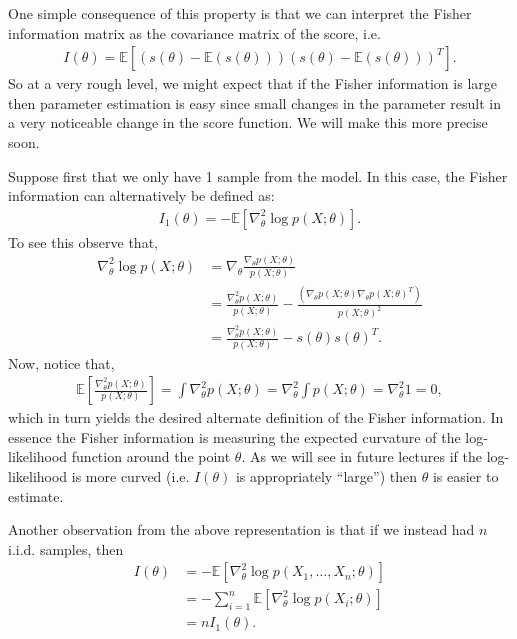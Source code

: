 \documentclass[twoside,12pt]{article}
\begin{document}
One simple consequence of this property is that we can interpret the Fisher information matrix as the covariance matrix of the score, i.e.
\begin{align*}
I(\theta) = \mathbb{E} [ (s(\theta) - \mathbb{E}(s(\theta)))(s(\theta)  - \mathbb{E}(s(\theta)))^T].
\end{align*}
So at a very rough level, we might expect that if the Fisher information is large then parameter estimation is easy since small changes in the parameter result in a very noticeable change in the score function. We will make this more precise soon. 

Suppose first that we only have 1 sample from the model. In this case, the Fisher information can alternatively be defined as:
\begin{align*}
I_1(\theta) = - \mathbb{E} \left[ \nabla_{\theta}^2 \log p(X; \theta)  \right].
\end{align*}
To see this observe that,
\begin{align*}
\nabla_{\theta}^2 \log p(X; \theta) &= \nabla_{\theta} \frac{\nabla_{\theta} p(X;\theta)}{p(X;\theta)} \\
&= \frac{ \nabla_{\theta}^2 p(X;\theta) }{p(X;\theta)} - \frac{ (\nabla_{\theta} p(X;\theta) \nabla_{\theta} p(X;\theta)^T) }{ p(X;\theta)^2} \\
&= \frac{ \nabla_{\theta}^2 p(X;\theta) }{p(X;\theta)} - s(\theta) s(\theta)^T.
\end{align*}
Now, notice that,
\begin{align*}
\mathbb{E}\left[\frac{ \nabla_{\theta}^2 p(X;\theta) }{p(X;\theta)}\right] = \int \nabla_{\theta}^2 p(X;\theta) = \nabla_{\theta}^2 \int p(X;\theta) = \nabla_{\theta}^2 1 = 0,
\end{align*}
which in turn yields the desired alternate definition of the Fisher information. In essence the Fisher information is measuring the expected curvature of the log-likelihood function around the point $\theta$. As we will see in future lectures if the log-likelihood is more curved (i.e. $I(\theta)$ is appropriately ``large'') then $\theta$ is easier to estimate.

Another observation from the above representation is that if we instead had $n$ i.i.d. samples, then
\begin{align*}
I(\theta) &= - \mathbb{E} \left[ \nabla_{\theta}^2 \log p(X_1,\ldots,X_n; \theta)  \right] \\
&= - \sum_{i=1}^n  \mathbb{E} \left[ \nabla_{\theta}^2 \log p(X_i; \theta)  \right] \\
&= n I_1(\theta).
\end{align*}
\end{document}
